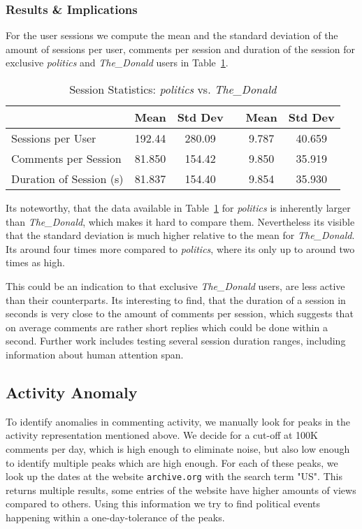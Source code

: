 \documentclass[runningheads,a4paper]{llncs}
\newcommand{\boards}[1]{\textit{politics} #1 \textit{The\_Donald}}
\begin{document}
	\subsubsection{Results \& Implications}
	For the user sessions we compute the mean and the standard deviation of the amount of sessions per user, comments per session and duration of the session for exclusive \boards{and} users in Table~\ref{table:session_stats}.
	\begin{table}
		\caption{Session Statistics: \textit{politics} vs. \textit{The\_Donald}}
		\centering
		\setlength{\tabcolsep}{5px}
		\begin{tabular}{lccccc}
			\hline\hline
			                        &  Mean  & Std Dev &  & Mean  & Std Dev \\ \hline
			Sessions per User       & 192.44 & 280.09  &  & 9.787 & 40.659  \\
			Comments per Session    & 81.850 & 154.42  &  & 9.850 & 35.919  \\
			Duration of Session (s) & 81.837 & 154.40  &  & 9.854 & 35.930  \\ \hline\hline
		\end{tabular}
		\label{table:session_stats}
	\end{table}
	Its noteworthy, that the data available in Table~\ref{table:session_stats} for \textit{politics} is inherently larger than \textit{The\_Donald}, which makes it hard to compare them. Nevertheless its visible that the standard deviation is much higher relative to the mean for \textit{The\_Donald}. Its around four times more compared to \textit{politics}, where its only up to around two times as high.
	
	This could be an indication to that exclusive \textit{The\_Donald} users, are less active than their counterparts. Its interesting to find, that the duration of a session in seconds is very close to the amount of comments per session, which suggests that on average comments are rather short replies which could be done within a second. Further work includes testing several session duration ranges, including information about human attention span.
	\subsection{Activity Anomaly}
	To identify anomalies in commenting activity, we manually look for peaks in the activity representation mentioned above. We decide for a cut-off at 100K comments per day, which is high enough to eliminate noise, but also low enough to identify multiple peaks which are high enough. For each of these peaks, we look up the dates at the website \texttt{archive.org} with the search term "US". This returns multiple results, some entries of the website have higher amounts of views compared to others. Using this information we try to find political events happening within a one-day-tolerance of the peaks.
\end{document}
